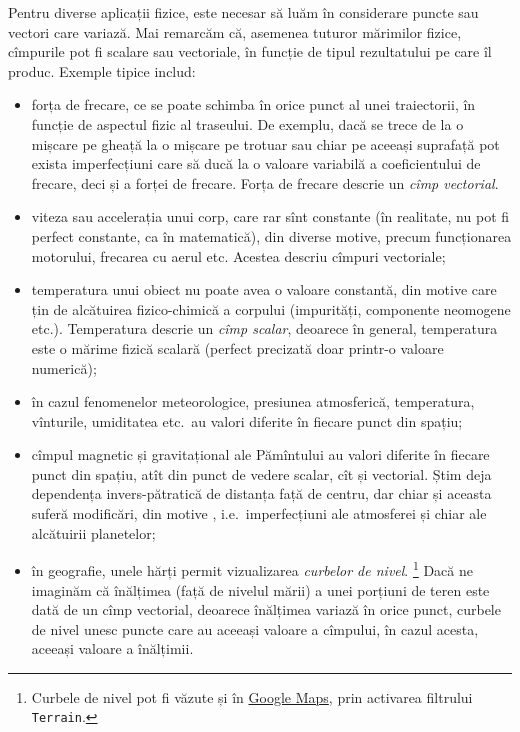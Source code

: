Pentru diverse aplicații fizice, este necesar să luăm în considerare
puncte sau vectori care variază. Mai remarcăm că, asemenea tuturor mărimilor
fizice, cîmpurile pot fi scalare sau vectoriale, în funcție de tipul rezultatului
pe care îl produc. Exemple tipice includ:
\begin{itemize}
\item forța de frecare, ce se poate schimba în orice punct al unei traiectorii,
  în funcție de aspectul fizic al traseului. De exemplu, dacă se trece de la
  o mișcare pe gheață la o mișcare pe trotuar sau chiar pe aceeași suprafață
  pot exista imperfecțiuni care să ducă la o valoare variabilă a coeficientului
  de frecare, deci și a forței de frecare. Forța de frecare descrie un
  \emph{cîmp vectorial}.
\item viteza sau accelerația unui corp, care rar sînt constante (în realitate,
  nu pot fi perfect constante, ca în matematică), din diverse motive, precum
  funcționarea motorului, frecarea cu aerul etc. Acestea descriu cîmpuri vectoriale;
\item temperatura unui obiect nu poate avea o valoare constantă, din motive
  care țin de alcătuirea fizico-chimică a corpului (impurități, componente
  neomogene etc.). Temperatura descrie un \emph{cîmp scalar}, deoarece în general,
  temperatura este o mărime fizică scalară (perfect precizată doar printr-o
  valoare numerică);
\item în cazul fenomenelor meteorologice, presiunea atmosferică, temperatura,
  vînturile, umiditatea etc.\ au valori diferite în fiecare punct din spațiu;
\item cîmpul magnetic și gravitațional ale Pămîntului au valori diferite în
  fiecare punct din spațiu, atît din punct de vedere scalar, cît și vectorial.
  Știm deja dependența invers-pătratică de distanța față de centru, dar chiar
  și aceasta suferă modificări, din motive , i.e.\ imperfecțiuni
  ale atmosferei și chiar ale alcătuirii planetelor;
\item în geografie, unele hărți permit vizualizarea \emph{curbelor de nivel}.
  \footnote{Curbele de nivel pot fi văzute și în \href{https://www.google.com/maps/place/Romania/@45.5287157,25.2357674,15z/data=!4m5!3m4!1s0x40b1ff26958976c3:0x84ef4f92a804b194!8m2!3d45.943161!4d24.96676!5m1!1e4?hl=en}{Google Maps}, prin activarea
    filtrului \texttt{Terrain}.}
  Dacă ne imaginăm că înălțimea (față de nivelul mării) a unei porțiuni de teren
  este dată de un cîmp vectorial, deoarece înălțimea variază în orice punct,
  curbele de nivel unesc puncte care au aceeași valoare a cîmpului, în cazul
  acesta, aceeași valoare a înălțimii.
\end{itemize}

